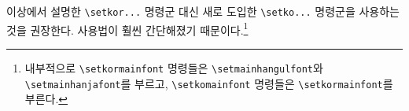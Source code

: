\documentclass[
	12pt,
	a4paper,
	kosection,
	footnote,
	nobookmarks,
	microtype,
]{oblivoir}
\def\cs#1{\texttt{\textbackslash #1}}
\newcommand\xobclass{x\-ob\-liv\-oir\oblivoirallowbreak}
\def\xetexko{\XeTeX-\ko}
\begin{document}
이상에서 설명한 \cs{setkor...} 명령군 대신 새로 도입한 \cs{setko...} 명령군을
사용하는 것을 권장한다. 사용법이 훨씬 간단해졌기 때문이다.\footnote{%
	내부적으로 \cs{setkormainfont} 명령들은 \cs{setmainhangulfont}와 \cs{setmainhanjafont}를
	부르고, \cs{setkomainfont} 명령들은 \cs{setkormainfont}를 부른다.}

%
%
%
%
%
\end{document}
